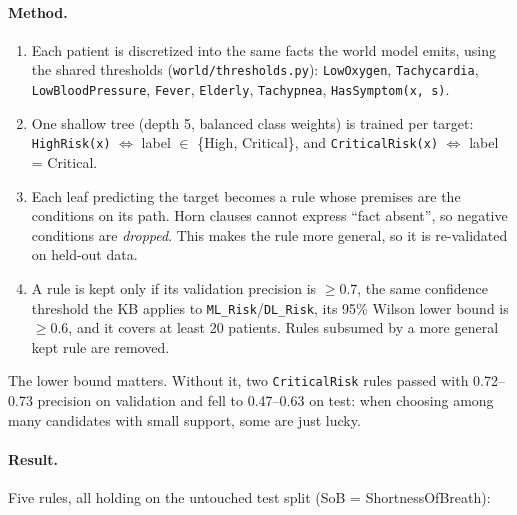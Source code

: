 \paragraph{Method.}
\begin{enumerate}
  \item Each patient is discretized into the same facts the world model emits, using the shared thresholds
  (\texttt{world/thresholds.py}): \texttt{LowOxygen}, \texttt{Tachycardia}, \texttt{LowBloodPressure},
  \texttt{Fever}, \texttt{Elderly}, \texttt{Tachypnea}, \texttt{HasSymptom(x, s)}.
  \item One shallow tree (depth 5, balanced class weights) is trained per target:
  \texttt{HighRisk(x)} $\Leftrightarrow$ label $\in$ \{High, Critical\}, and
  \texttt{CriticalRisk(x)} $\Leftrightarrow$ label = Critical.
  \item Each leaf predicting the target becomes a rule whose premises are the conditions on its path.
  Horn clauses cannot express ``fact absent'', so negative conditions are \emph{dropped}. This makes the
  rule more general, so it is re-validated on held-out data.
  \item A rule is kept only if its validation precision is $\geq0.7$, the same confidence threshold the KB
  applies to \texttt{ML\_Risk}/\texttt{DL\_Risk}, its 95\% Wilson lower bound is $\geq0.6$, and it covers at
  least 20 patients. Rules subsumed by a more general kept rule are removed.
\end{enumerate}

The lower bound matters. Without it, two \texttt{CriticalRisk} rules passed with 0.72--0.73 precision on
validation and fell to 0.47--0.63 on test: when choosing among many candidates with small support, some are
just lucky.

\paragraph{Result.} Five rules, all holding on the untouched test split (SoB = ShortnessOfBreath):

\begin{center}
\end{center}

